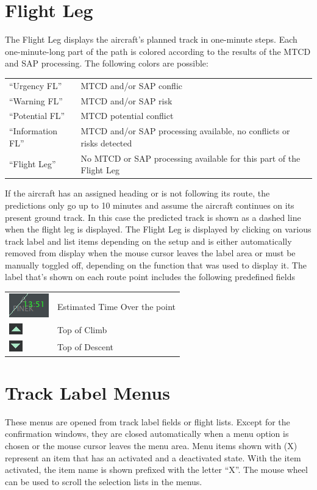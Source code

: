 \documentclass[11pt,a4paper,oldfontcommands]{memoir}
\begin{document}
\section{Flight Leg}
The Flight Leg displays the aircraft’s planned track in one-minute steps. Each one-minute-long part of the
path is colored according to the results of the MTCD and SAP processing. The following colors are possible:
\medskip
\begin{tabular}{l l}
“Urgency FL”        & MTCD and/or SAP conflic
\\“Warning FL”      & MTCD and/or SAP risk
\\“Potential FL”    & MTCD potential conflict
\\“Information FL”  & MTCD and/or SAP processing available, no conflicts or risks detected
\\“Flight Leg”      & No MTCD or SAP processing available for this part of the Flight Leg
\end{tabular}
\medskip
If the aircraft has an assigned heading or is not following its route, the predictions only go up to 10 minutes
and assume the aircraft continues on its present ground track. In this case the predicted track is shown as a
dashed line when the flight leg is displayed.
\medskip
The Flight Leg is displayed by clicking on various track label and list items depending on the setup and is
either automatically removed from display when the mouse cursor leaves the label area or must be
manually toggled off, depending on the function that was used to display it.
\medskip
The label that’s shown on each route point includes the following predefined fields
\begin{tabular}{l l}
\includegraphics{img/fleto.png}     & Estimated Time Over the point
\\\includegraphics{img/fltoc.png}   & Top of Climb
\\\includegraphics{img/fltod.png}   & Top of Descent
\end{tabular}

\section{Track Label Menus}
These menus are opened from track label fields or flight lists. Except for the confirmation windows, they
are closed automatically when a menu option is chosen or the mouse cursor leaves the menu area. Menu
items shown with (X) represent an item that has an activated and a deactivated state. With the item
activated, the item name is shown prefixed with the letter “X”. The mouse wheel can be used to scroll the
selection lists in the menus.
\end{document}
